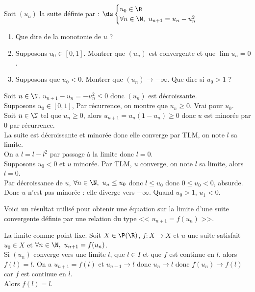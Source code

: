 \documentclass[11pt]{article}
\begin{document}
\begin{ex}{}{}
    Soit $(u_n)$ la suite définie par : $\ds\begin{cases}u_0 \in \R\\ \forall n \in \N, ~ u_{n+1} = u_n - u_n^2\end{cases}$
    \begin{enumerate}
        \item Que dire de la monotonie de $u$ ?
        \item Supposons $u_0\in[0,1]$. Montrer que $(u_n)$ est convergente et que $\lim u_n = 0$.
        \item Supposons que $u_0 < 0$. Montrer que $(u_n)\to-\infty$. Que dire si $u_0>1$ ?
    \end{enumerate}
    \tcblower
     Soit $n\in\N$. $u_{n+1}-u_n=-u_n^2\leq0$ donc $(u_n)$ est décroissante.\\
     Supposons $u_0\in[0,1]$, Par récurrence, on montre que $u_n\geq0$. Vrai pour $u_0$.\\
    Soit $n\in\N$ tel que $u_n\geq0$, alors $u_{n+1}=u_n(1-u_n)\geq0$ donc $u$ est minorée par 0 par récurrence.\\
    La suite est décroissante et minorée donc elle converge par TLM, on note $l$ sa limite.\\
    On a $l=l-l^2$ par passage à la limite donc $l=0$.\\
     Supposons $u_0<0$ et $u$ minorée. Par TLM, $u$ converge, on note $l$ sa limite, alors $l=0$.\\
    Par décroissance de $u$, $\forall n \in \N, ~ u_n \leq u_0$ donc $l \leq u_0$ donc $0 \leq u_0 < 0$, absurde.\\
    Donc $u$ n'est pas minorée : elle diverge vers $-\infty$. Quand $u_0>1$, $u_1 < 0$.
\end{ex}

\quad Voici un résultat utilisé pour obtenir une équation sur la limite d'une suite convergente définie par une relation du type << $u_{n+1}=f(u_n)$ >>.

\begin{prop}{La limite comme point fixe.}{}
    Soit $X\in\P(\R)$, $f:X\to X$ et $u$ une suite satisfait $u_0\in X$ et $\forall n \in \N, ~ u_{n+1}=f(u_n)$.\\
    Si $(u_n)$ converge vers une limite $l$, que $l\in I$ et que $f$ est continue en $l$, alors $f(l)=l$.
    \tcblower
    On a $u_{n+1}=f(l)$ et $u_{n+1}\to l$ donc $u_n\to l$ donc $f(u_n)\to f(l)$ car $f$ est continue en $l$.\\
    Alors $f(l)=l$.
\end{prop}
\end{document}
